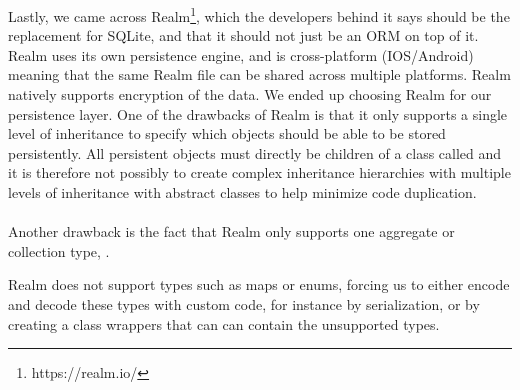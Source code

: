 
Lastly, we came across Realm\footnote{https://realm.io/}, which the developers behind it says should be the replacement for SQLite, and that it should not just be an ORM on top of it. Realm uses its own persistence engine, and is cross-platform (IOS/Android) meaning that the same Realm file can be shared across multiple platforms. Realm natively supports encryption of the data. We ended up choosing Realm for our persistence layer. One of the drawbacks of Realm is that it only supports a single level of inheritance to specify which objects should be able to be stored persistently. All persistent objects must directly be children of a class called  and it is therefore not possibly to create complex inheritance hierarchies with multiple levels of inheritance with abstract classes to help minimize code duplication.  
\\\\
Another drawback is the fact that Realm only supports one aggregate or collection type, . 

Realm does not support types such as maps or enums, forcing us to either encode and decode these types with custom code, for instance by serialization, or by creating a class wrappers that can can contain the unsupported types.


